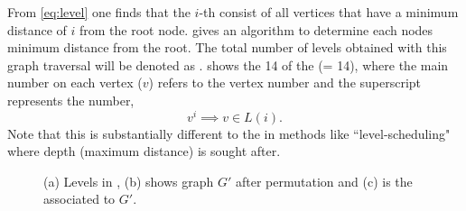 From \cref{eq:level} one finds that the $i$-th \level consist of all vertices that have a minimum distance of $i$ from the root node.  gives an algorithm to determine each nodes minimum distance from the root. The total number of levels obtained with this graph traversal will be denoted as \totalLvl.  shows the 14 \levels of the \stex (\totalLvl = 14), where the main number on each vertex ($v$) refers to the vertex number and the superscript represents the \level number, \ie
\begin{equation}\label{eq:node_notation}
	v^i \implies v \in L(i).
\end{equation}
Note that this is substantially different to the \levels in methods like ``level-scheduling" \cite{saad} where depth (maximum distance) is sought after.

\begin{figure}[tbhp]
	\centering
	\hspace{1em}
	\hspace{1em}
	\caption{(a) Levels in \stex, (b) shows graph $G'$ after permutation and (c) is the associated \levelPtr to $G'$.}
	\label{fig:2d-7pt_step_1_2}
\end{figure}


